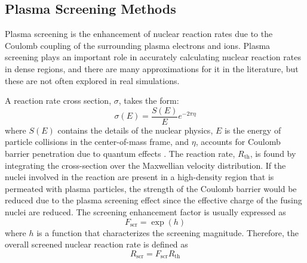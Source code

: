 \documentclass[preprint,times,tighten]{aastex631}
\begin{document}


\subsection{Plasma Screening Methods}\label{Sec:screening}

Plasma screening is the enhancement of nuclear reaction rates due to the Coulomb coupling of the surrounding plasma electrons and ions. Plasma screening plays an important role in accurately calculating nuclear reaction rates in dense regions,
and there are many approximations for it in the literature, but these are not
often explored in real simulations.  

A reaction rate cross section, $\sigma$, takes the form:
\begin{equation}
    \sigma(E) = \frac{S(E)}{E} e^{-2\pi \eta}
\end{equation}
where $S(E)$ contains the details of the nuclear physics, $E$ is the energy of particle collisions in the center-of-mass frame, and $\eta$, accounts for Coulomb barrier penetration due to quantum effects \citep{Newton2007}. The reaction rate, $R_{\textrm{th}}$, is found by integrating the cross-section over the Maxwellian velocity distribution.  If the nuclei involved in the reaction are present in a high-density region that is permeated with plasma particles, the strength of the Coulomb barrier would be reduced due to the plasma screening effect since the effective charge of the fusing nuclei are reduced. The screening enhancement factor is usually expressed as
\begin{equation}
    F_{\textrm{scr}} = \exp{(h)}
\end{equation}
where $h$ is a function that characterizes the screening magnitude. Therefore, the overall screened nuclear reaction rate is defined as
\begin{equation}\label{Eq:screened_rate}
    R_{\textrm{scr}} = F_{\textrm{scr}}R_{\textrm{th}}
\end{equation}
\end{document}
